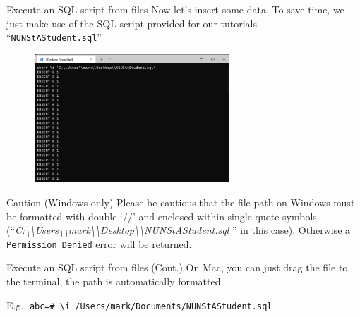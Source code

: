 \begin{frame}[fragile]{Execute an SQL script from files}
	Now let's insert some data. To save time, we just make use of the SQL script provided for our tutorials -- ``\texttt{NUNStAStudent.sql}''
	
	\begin{figure}
		\includegraphics[trim=0 5cm 0 0, clip, width=0.65\textwidth]{t0-psql/images/7.png}
	\end{figure}
	
	\begin{alertblock}{Caution (Windows only)}
		Please be cautious that the file path on Windows must be formatted with double `//' and enclosed within single-quote symbols (``\textit{C:\textbackslash\textbackslash Users\textbackslash\textbackslash mark\textbackslash\textbackslash Desktop\textbackslash\textbackslash NUNStAStudent.sql }'' in this case). Otherwise a \texttt{Permission Denied} error will be returned.
	\end{alertblock}
	
\end{frame}

\begin{frame}[fragile]{Execute an SQL script from files (Cont.)}
	On Mac, you can just drag the file to the terminal, the path is automatically formatted.\vspace{20pt}
	
	E.g., \texttt{abc=\# \textbackslash i /Users/mark/Documents/NUNStAStudent.sql}
	
\end{frame}



